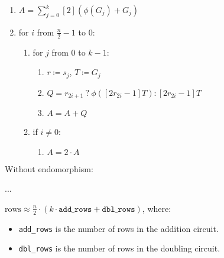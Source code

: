 \begin{enumerate}
	\item $A = \sum\limits_{j = 0}^{k} [2](\phi(G_j) + G_j)$
	\item for $i$ from $\frac{n}{2} - 1$ to $0$:
	\begin{enumerate}
		\item for $j$ from $0$ to $k-1$:
		\begin{enumerate}
			\item $r \coloneqq s_j$, $T \coloneqq G_j$
			\item $Q = r_{2i + 1} \: ? \: \phi([2r_{2i} - 1]T) : [2r_{2i} - 1]T$
			\item $A = A + Q$
		\end{enumerate}
		\item if $i \neq 0$:
		\begin{enumerate}
			\item $A = 2 \cdot A$
		\end{enumerate}
	\end{enumerate}
\end{enumerate}

Without endomorphism: 

...

$\text{rows} \approx \frac{n}{2} \cdot (k \cdot \texttt{add\_rows} + \texttt{dbl\_rows})$, where:
\begin{itemize}
	\item \texttt{add\_rows} is the number of rows in the addition circuit. 
	\item \texttt{dbl\_rows} is the number of rows in the doubling circuit. 
\end{itemize}